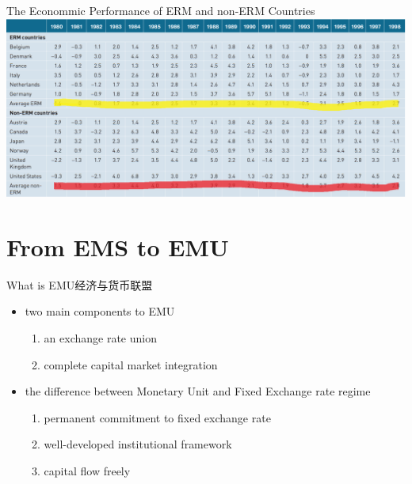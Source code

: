 \documentclass[10pt,hyperref={CJKbookmarks=true},xcolor=dvipsnames,aspectratio=169]{beamer}
\begin{document}
\begin{frame}{The Econommic Performance of ERM and non-ERM Countries}
		\centering
\includegraphics[scale=0.42]{fig/euro/growth}
\end{frame}

\section{From EMS to EMU}
\begin{frame}{What is EMU经济与货币联盟}

	\begin{itemize}
		\item two main components to EMU
		\begin{enumerate}
			\item an exchange rate union 
			\item complete capital market integration
		\end{enumerate}
	\item the difference between Monetary Unit and Fixed Exchange rate regime
			\begin{enumerate}
		\item permanent commitment to fixed exchange rate 
		\item well-developed		institutional framework
		\item capital flow freely
	\end{enumerate}
	\end{itemize}
\end{frame}
\end{document}
